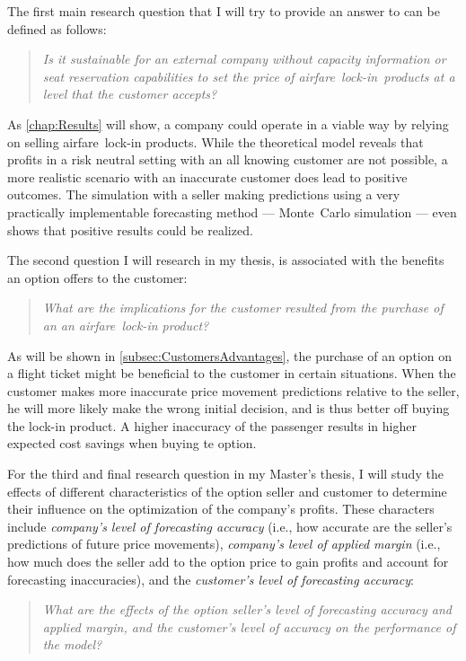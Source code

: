 The first main research question that I will try to provide an answer to can be defined as follows:

\begin{quote}\emph{Is it sustainable for an external company without capacity information or seat reservation capabilities to set the price of airfare~lock-in~products at a level that the customer accepts?}\end{quote}

As \autoref{chap:Results} will show, a company could operate in a viable way by relying on selling airfare~lock-in products. While the theoretical model reveals that profits in a risk neutral setting with an all knowing customer are not possible, a more realistic scenario with an inaccurate customer does lead to positive outcomes. The simulation with a seller making predictions using a very practically implementable forecasting method --- Monte~Carlo simulation --- even shows that positive results could be realized.

The second question I will research in my thesis, is associated with the benefits an option offers to the customer:

\begin{quote}\emph{What are the implications for the customer resulted from the purchase of an an airfare~lock-in product?}\end{quote}

As will be shown in \autoref{subsec:CustomersAdvantages}, the purchase of an option on a flight ticket might be beneficial to the customer in certain situations. When the customer makes more inaccurate price movement predictions relative to the seller, he will more likely make the wrong initial decision, and is thus better off buying the lock-in product. A higher inaccuracy of the passenger results in higher expected cost savings when buying te option.

For the third and final research question in my Master's thesis, I will study the effects of different characteristics of the option seller and customer to determine their influence on the optimization of the company's profits. These characters include \emph{company's level of forecasting accuracy} (i.e., how accurate are the seller's predictions of future price movements), \emph{company's level of applied margin} (i.e., how much does the seller add to the option price to gain profits and account for forecasting inaccuracies), and the \emph{customer's level of forecasting accuracy}:

\begin{quote}\emph{What are the effects of the option seller's level of forecasting accuracy and applied margin, and the customer's level of accuracy on the performance of the model?}\end{quote}

